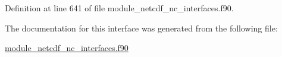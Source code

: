 Definition at line 641 of file module\+\_\+netcdf\+\_\+nc\+\_\+interfaces.\+f90.



The documentation for this interface was generated from the following file\+:\begin{DoxyCompactItemize}
\item 
\hyperlink{module__netcdf__nc__interfaces_8f90}{module\+\_\+netcdf\+\_\+nc\+\_\+interfaces.\+f90}\end{DoxyCompactItemize}
